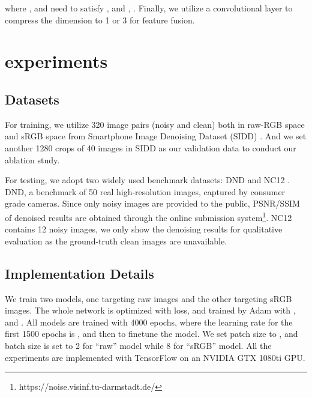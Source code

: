 \documentclass[conference]{IEEEtran}
\begin{document}
where ,  and  need to satisfy , and , . Finally, we utilize a  convolutional layer to compress the dimension to 1 or 3 for feature fusion.
\section{experiments}
\subsection{Datasets}\label{AA}
For training, we utilize 320 image pairs (noisy and clean) both in raw-RGB space and sRGB space from Smartphone Image Denoising Dataset (SIDD) \cite{SIDD}. And we set another 1280  crops of 40 images in SIDD as our validation data to conduct our ablation study.

For testing, we adopt two widely used benchmark datasets: DND \cite{DND} and NC12 \cite{NC}. DND, a benchmark of 50 real high-resolution images, captured by consumer grade cameras. Since only noisy images are provided to the public, PSNR/SSIM of denoised results are obtained through the online submission system\footnote{https://noise.visinf.tu-darmstadt.de/}. NC12 contains 12 noisy images, we only show the denoising results for qualitative evaluation as the ground-truth clean images are unavailable.
\subsection{Implementation Details}
We train two models, one targeting raw images and the other targeting sRGB images. The whole network is optimized with \emph{} loss, and trained by Adam with ,  and . All models are trained with 4000 epochs, where the learning rate for the first 1500 epochs is , and then  to finetune the model. We set patch size to , and batch size is set to 2 for ``raw'' model while 8 for ``sRGB'' model. All the experiments are implemented with TensorFlow on an NVIDIA GTX 1080ti GPU.
\end{document}
